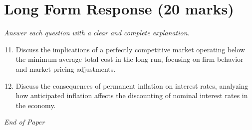 \documentclass[12pt]{article}
\begin{document}
\section*{Long Form Response (20 marks)}
\textit{Answer each question with a clear and complete explanation.}
\begin{enumerate}[label=\arabic*.]
\setcounter{enumi}{10}
\item Discuss the implications of a perfectly competitive market operating below the minimum average total cost in the long run, focusing on firm behavior and market pricing adjustments.
\item Discuss the consequences of permanent inflation on interest rates, analyzing how anticipated inflation affects the discounting of nominal interest rates in the economy.
\end{enumerate}

\vfill
\noindent\textit{End of Paper}
\end{document}
